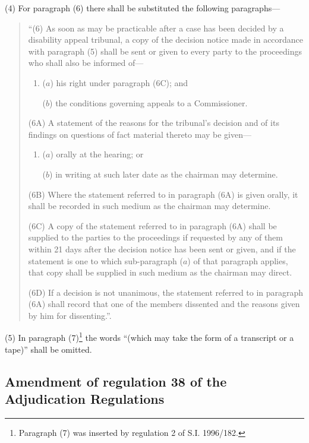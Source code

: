 \documentclass[a4paper]{article}
\begin{document}
(4) For paragraph (6) there shall be substituted the following paragraphs—
\begin{quotation}
“(6) As soon as may be practicable after a case has been decided by a disability appeal tribunal, a copy of the decision notice made in accordance with paragraph (5) shall be sent or given to every party to the proceedings who shall also be informed of—
\begin{enumerate}\item[]
($a$) his right under paragraph (6C); and

($b$) the conditions governing appeals to a Commissioner.
\end{enumerate}

(6A) A statement of the reasons for the tribunal’s decision and of its findings on questions of fact material thereto may be given—
\begin{enumerate}\item[]
($a$) orally at the hearing; or

($b$) in writing at such later date as the chairman may determine.
\end{enumerate}

(6B) Where the statement referred to in paragraph (6A) is given orally, it shall be recorded in such medium as the chairman may determine.

(6C) A copy of the statement referred to in paragraph (6A) shall be supplied to the parties to the proceedings if requested by any of them within 21 days after the decision notice has been sent or given, and if the statement is one to which sub-paragraph ($a$) of that paragraph applies, that copy shall be supplied in such medium as the chairman may direct.

(6D) If a decision is not unanimous, the statement referred to in paragraph (6A) shall record that one of the members dissented and the reasons given by him for dissenting.”.
\end{quotation}

(5) In paragraph (7)\footnote{\frenchspacing Paragraph (7) was inserted by regulation 2 of S.I. 1996/182.} the words “(which may take the form of a transcript or a tape)” shall be omitted.

\subsection[13. Amendment of regulation 38 of the Adjudication Regulations]{Amendment of regulation 38 of the Adjudication Regulations}
\end{document}
